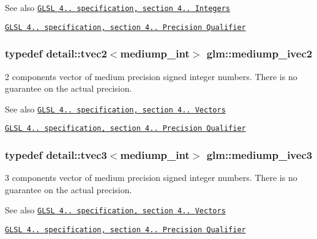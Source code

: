 \begin{DoxySeeAlso}{See also}
\href{http://www.opengl.org/registry/doc/GLSLangSpec.4.20.8.pdf}{\tt G\+L\+S\+L 4.. specification, section 4.. Integers} 

\href{http://www.opengl.org/registry/doc/GLSLangSpec.4.20.8.pdf}{\tt G\+L\+S\+L 4.. specification, section 4.. Precision Qualifier} 
\end{DoxySeeAlso}
\hypertarget{group__core__precision_ga4803c44369a1aea2e7e51397c341ce6f}{}
\subsubsection[{mediump\+\_\+ivec2}]{\setlength{\rightskip}{0pt plus 5cm}typedef detail\+::tvec2$<$mediump\+\_\+int$>$ {\bf glm\+::mediump\+\_\+ivec2}}\label{group__core__precision_ga4803c44369a1aea2e7e51397c341ce6f}
2 components vector of medium precision signed integer numbers. There is no guarantee on the actual precision.

\begin{DoxySeeAlso}{See also}
\href{http://www.opengl.org/registry/doc/GLSLangSpec.4.20.8.pdf}{\tt G\+L\+S\+L 4.. specification, section 4.. Vectors} 

\href{http://www.opengl.org/registry/doc/GLSLangSpec.4.20.8.pdf}{\tt G\+L\+S\+L 4.. specification, section 4.. Precision Qualifier} 
\end{DoxySeeAlso}
\hypertarget{group__core__precision_gab824e682bc463998efbcd4a512ebf209}{}
\subsubsection[{mediump\+\_\+ivec3}]{\setlength{\rightskip}{0pt plus 5cm}typedef detail\+::tvec3$<$mediump\+\_\+int$>$ {\bf glm\+::mediump\+\_\+ivec3}}\label{group__core__precision_gab824e682bc463998efbcd4a512ebf209}
3 components vector of medium precision signed integer numbers. There is no guarantee on the actual precision.

\begin{DoxySeeAlso}{See also}
\href{http://www.opengl.org/registry/doc/GLSLangSpec.4.20.8.pdf}{\tt G\+L\+S\+L 4.. specification, section 4.. Vectors} 

\href{http://www.opengl.org/registry/doc/GLSLangSpec.4.20.8.pdf}{\tt G\+L\+S\+L 4.. specification, section 4.. Precision Qualifier} 
\end{DoxySeeAlso}
\hypertarget{group__core__precision_gaabd2534479a6e7e493a7362b9f4c63cd}{}
